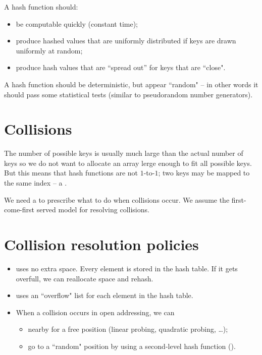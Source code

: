 A hash function should:
\begin{itemize}
\item be computable quickly (constant time);
\item produce hashed values that are uniformly distributed if keys are drawn uniformly at random;
\item produce hash values that are ``spread out'' for keys that are ``close". 
\end{itemize}
A hash function should be deterministic, but appear ``random" -- in other 
words it should pass some statistical tests (similar to pseudorandom number generators). 

\section{Collisions}
The number of possible keys is usually much large than the actual number of keys so we do not want to allocate an array lerge enough to fit all possible keys. 
But this means that hash functions are not $1$-to-$1$; two keys may be mapped to the same index -- a . 

We need a  to prescribe what to do when collisions occur. 
We assume the first-come-first served model for resolving collisions.

\section{Collision resolution policies}
\begin{itemize}
\item {} uses no extra space. Every element is stored in the hash table. 
If it gets overfull, we can reallocate space and rehash.
\item {} uses an ``overflow" list for each element in the hash table.
\item When a collision occurs in open addressing, we can 
	\begin{itemize}
		\item {} nearby for a free position (linear probing, quadratic probing, \ldots);
		\item go to a ``random" position by using a second-level hash function 
		().
	\end{itemize}
\end{itemize}

